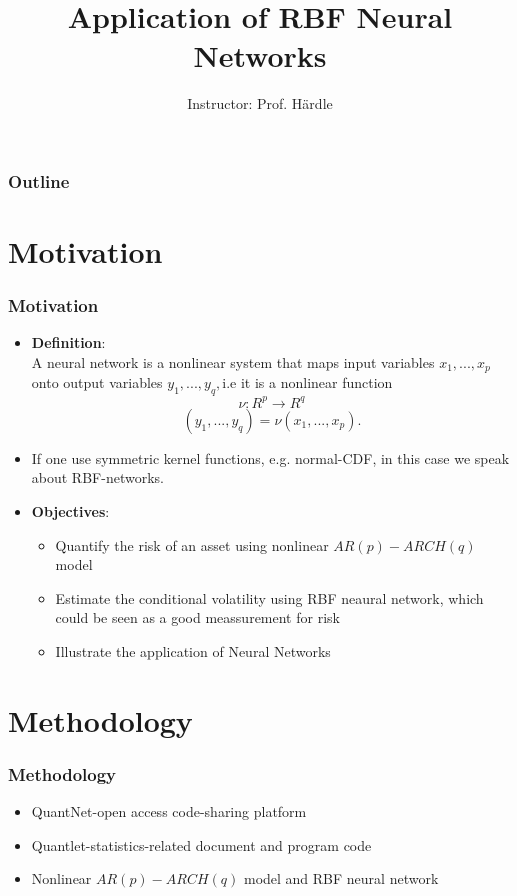 \documentclass[12pt]{beamer}
\title{Application of RBF Neural Networks}
\author[Gu Yanzhao]{Instructor: Prof. H\"{a}rdle} %
\institute[]{
	\textsl{Presenter: Gu Yanzhao}\\
	\textsl{ID: 27720151153545}
}
\date[July 16$^{th}, 2016$]{} %
\begin{document}
	
\begin{frame}
	\titlepage 
\end{frame}

\begin{frame}
	\frametitle{Outline} 
	\tableofcontents
\end{frame}

\section{Motivation}
\begin{frame}
	\frametitle{Motivation}
	\begin{itemize}
		\item  \textbf{Definition}:\\
		A neural network is a nonlinear system that maps input variables $x_{1},...,x_{p}$ onto output variables $y_{1},...,y_{q},$i.e it is a nonlinear function
		$$\nu:R^{p}\longrightarrow R^{q}$$
		$$(y_{1},...,y_{q})=\nu(x_{1},...,x_{p}).$$
		\item If one use symmetric kernel functions, e.g. normal-CDF, in this case we speak about RBF-networks.
	\end{itemize}
\end{frame}

\begin{frame}
	\begin{itemize}
		\item \textbf{Objectives}:\\
		\begin{itemize}
			\item [\checkmark] Quantify the risk of an asset using nonlinear $AR(p)-ARCH(q)$ model
			\item [\checkmark] Estimate the conditional volatility using RBF neaural network, which could be seen as a good meassurement for risk
			\item [\checkmark] Illustrate the application of Neural Networks
		\end{itemize}
	\end{itemize}
\end{frame}

\section{Methodology}
\begin{frame}
	\frametitle{Methodology}
	\begin{itemize}
		\item QuantNet-open access code-sharing platform
		\item Quantlet-statistics-related document and program code
		\item Nonlinear $AR(p)-ARCH(q)$ model and RBF neural network
	\end{itemize}
	
\end{frame}
\end{document}
